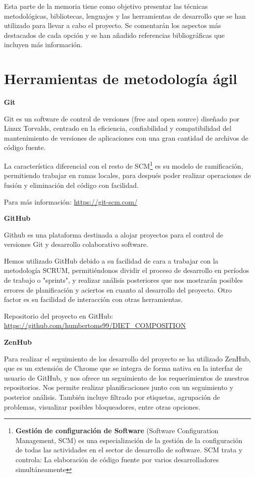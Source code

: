 
Esta parte de la memoria tiene como objetivo presentar las técnicas metodológicas, bibliotecas, lenguajes y las herramientas de desarrollo que se han utilizado para llevar a cabo el proyecto. Se comentarán los aspectos más destacados de cada opción y se han añadido referencias bibliográficas que incluyen más información.

\section{Herramientas de metodología ágil}
\textbf{Git}

Git es un software de control de versiones (free and open source) diseñado por Linux Torvalds, centrado en la eficiencia, confiabilidad y compatibilidad del mantenimiento de versiones de aplicaciones con una gran cantidad de archivos de código fuente. 

La característica diferencial con el resto de SCM\footnote{\textbf{Gestión de configuración de Software} (Software Configuration Management, SCM) es una especialización de la gestión de la configuración de todas las actividades en el sector de desarrollo de software. SCM trata y controla: La elaboración de código fuente por varios desarrolladores simultáneamente} es su modelo de ramificación, permitiendo trabajar en ramas locales, para después poder realizar operaciones de fusión y eliminación del código con facilidad.


Para más información: \url{https://git-scm.com/}

\textbf{GitHub} 

Github es una plataforma destinada a alojar proyectos para el control de versiones Git y desarrollo colaborativo software. 

Hemos utilizado GitHub debido a su facilidad de cara a trabajar con la metodología SCRUM, permitiéndonos dividir el proceso de desarrollo en períodos de trabajo o "sprints", y realizar análisis posteriores que nos mostrarán posibles errores de planificación y aciertos en cuanto al desarrollo del proyecto. Otro factor es su facilidad de interacción con otras herramientas.

Repositorio del proyecto en GitHub: \url{https://github.com/humbertoms99/DIET_COMPOSITION}

\textbf{ZenHub}

Para realizar el seguimiento de los desarrollo del proyecto se ha utilizado ZenHub, que es un extensión de Chrome que se integra de forma nativa en la interfaz de usuario de GitHub, y nos  ofrece un seguimiento de los requerimientos de nuestros repositorios. Nos permite realizar planificaciones junto con un seguimiento y posterior análisis. También incluye filtrado por etiquetas, agrupación de problemas, visualizar posibles bloqueadores, entre otras opciones. 

